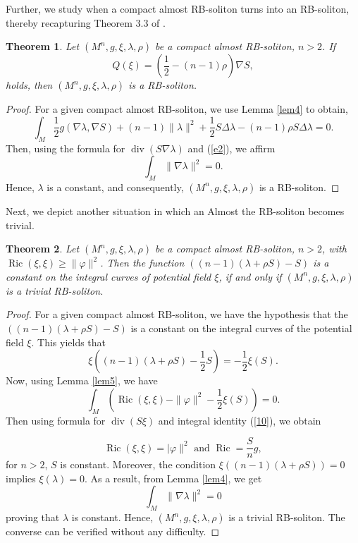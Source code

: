 \documentclass[a4paper, twoside, 10pt]{article}
\numberwithin{equation}{section}
\newtheorem{theorem}{Theorem}[section]
\theoremstyle{definition}
\begin{document}
Further, we study when a compact almost RB-soliton turns into an RB-soliton, thereby recapturing Theorem $3.3$ 
of \cite{SDANARS}.
\begin{theorem}\label{thm4.2}
     Let $(M^n,g,\xi,\lambda,\rho)$ be a compact almost RB-soliton, $n>2$. If 
     \begin{equation}\label{e2}
         Q(\xi)=\left(\frac{1}{2}-(n-1)\rho\right)\nabla S,
     \end{equation}
     holds, then $(M^n,g,\xi,\lambda,\rho)$ is  a RB-soliton.
 \end{theorem}
 \begin{proof}
    For a given  compact almost RB-soliton, we use Lemma \ref{lem4}  to obtain,
    $$
    \int_M\frac{1}{2}g(\nabla\lambda,\nabla S)+(n-1)\|\lambda\|^2+\frac{1}{2}S\Delta\lambda-(n-1)\rho S\Delta\lambda=0.
    $$
Then, using the formula for $\operatorname{div}(S\nabla\lambda)$ and (\ref{e2}), we affirm
     $$\int_M\|\nabla\lambda\|^2=0.$$
    Hence, $\lambda$ is a constant, and consequently, $(M^n,g,\xi,\lambda,\rho)$ is a RB-soliton.
 \end{proof}

 Next, we depict another situation in which an 
 Almost the RB-soliton becomes trivial. 
 
\begin{theorem}\label{thm4.3}
     Let $(M^n,g,\xi,\lambda,\rho)$ be a compact almost RB-soliton, $n>2$, with $\operatorname{Ric}(\xi,\xi)\geq\|\varphi\|^2$. Then the function $((n-1)(\lambda+\rho S)-S)$ is a constant on the integral curves of potential field $\xi$, if and only if $(M^n,g,\xi,\lambda,\rho)$ is a trivial RB-soliton.
 \end{theorem}
\begin{proof}
  For a given compact almost RB-soliton, we have the hypothesis that the $((n-1)(\lambda+\rho S)-S)$ is a constant on the integral curves of the potential field $\xi$.
  This yields that
  \[
\xi\left((n-1)(\lambda+\rho S)-\frac{1}{2}S\right)=-\frac{1}{2}\xi(S).
  \]
    Now, using Lemma \ref{lem5}, we have
    \[
    \int_M\left(\operatorname{Ric}(\xi,\xi)-\|\varphi\|^2-\frac{1}{2}\xi(S)\right)=0.
    \]
Then using formula for $\operatorname{div}(S \xi)$ and 
integral identity (\ref{10}), we obtain

    \[\operatorname{Ric}(\xi,\xi)=|\varphi\|^2\text{ and } \operatorname{Ric}= \frac{S}{n}g,\]
    for $n>2$, $S$ is constant. Moreover, the condition $\xi\left((n-1)(\lambda+\rho S)\right)=0$ implies $\xi(\lambda)=0$. As a result, from Lemma \ref{lem4}, we get 
    \[\int_M\|\nabla\lambda\|^2=0\]
    proving that $\lambda$ is constant. Hence, $(M^n,g,\xi,\lambda,\rho)$ is a trivial RB-soliton. The converse can be verified without any difficulty.
\end{proof}
\end{document}
